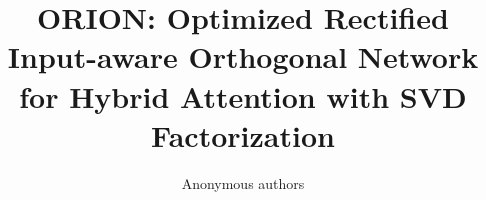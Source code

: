 \title{\textbf{ORION: Optimized Rectified Input-aware Orthogonal Network for Hybrid Attention with SVD Factorization}}

\author{Anonymous authors}
